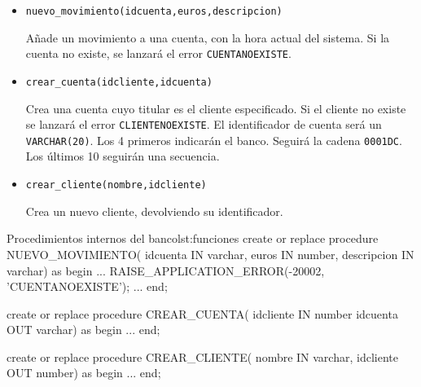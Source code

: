 \begin{homeworkProblem}


  \begin{itemize}
  \item \texttt{nuevo\_movimiento(idcuenta,euros,descripcion)}

    
    \begin{Indentado}
      Añade un movimiento a una cuenta, con la hora actual del sistema. Si la cuenta no existe, se lanzará el error  \texttt{CUENTANOEXISTE}.
    \end{Indentado}
    
  \item \texttt{crear\_cuenta(idcliente,idcuenta)}
    
    \begin{Indentado}
      Crea una cuenta cuyo titular es el cliente especificado. Si el cliente no existe se lanzará el error \texttt{CLIENTENOEXISTE}.  El identificador de cuenta será un \texttt{VARCHAR(20)}. Los 4 primeros indicarán el banco. Seguirá la cadena \texttt{0001DC}. Los últimos 10 seguirán una  secuencia.
    \end{Indentado}
    


    

    
  \item \texttt{crear\_cliente(nombre,idcliente)}
    
    \begin{Indentado}
      Crea un nuevo cliente, devolviendo su identificador. \\
    \end{Indentado}
  \end{itemize}


  \begin{listadosql}{Procedimientos internos del banco}{lst:funciones}
create or replace procedure NUEVO_MOVIMIENTO(
  idcuenta IN varchar, 
  euros IN number,
  descripcion IN varchar)
as begin
  ...
  RAISE_APPLICATION_ERROR(-20002, 'CUENTANOEXISTE');
  ...
end; 

create or replace procedure CREAR_CUENTA(
  idcliente IN number
  idcuenta OUT varchar)
as begin
  ...
end; 

create or replace procedure CREAR_CLIENTE(
  nombre IN varchar, 
  idcliente OUT  number)
as begin
  ...
end; 


\end{listadosql}


\end{homeworkProblem}

